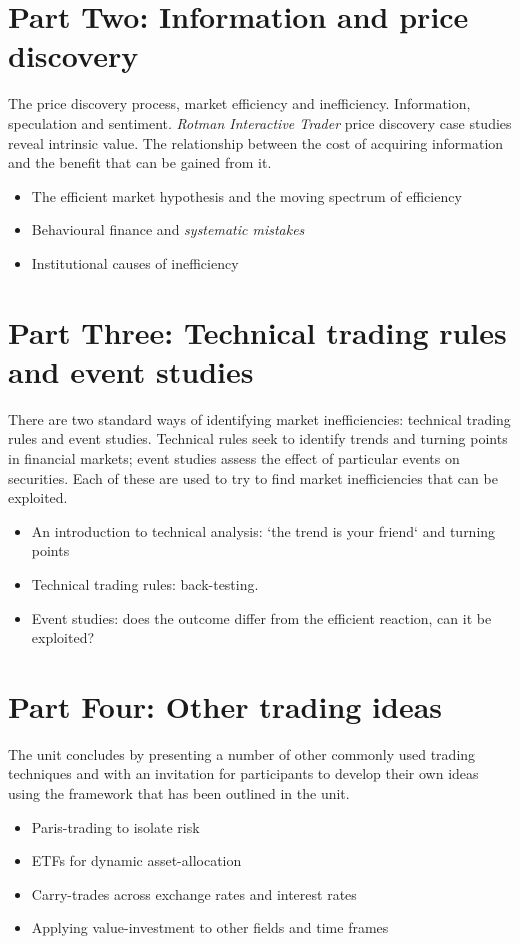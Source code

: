\documentclass[12pt, a4paper, oneside]{hitec}\usepackage[]{graphicx}\usepackage[]{color}
\begin{document}
\section*{Part Two: Information and price discovery}
The price discovery process, market efficiency and inefficiency.  Information, speculation and sentiment. \emph{Rotman Interactive Trader} price discovery case studies reveal intrinsic value.  The relationship between the cost of acquiring information and the benefit that can be gained from it. 
\begin{itemize}
\item The efficient market hypothesis and the moving spectrum of efficiency
\item Behavioural finance and \emph{systematic mistakes}
\item Institutional causes of inefficiency
\end{itemize}

\section*{Part Three: Technical trading rules and event studies}
There are two standard ways of identifying market inefficiencies: technical trading rules and event studies.  Technical rules seek to identify trends and turning points in financial markets; event studies assess the effect of particular events on securities. Each of these are used to try to find market inefficiencies that can be exploited. 
\begin{itemize}
\item An introduction to technical analysis: `the trend is your friend` and turning points
\item Technical trading rules: back-testing. 
\item Event studies: does the outcome differ from the efficient reaction, can it be exploited?
\end{itemize}

\section*{Part Four: Other trading ideas}
The unit concludes by presenting a number of other commonly used trading techniques and with an invitation for participants to develop their own ideas using the framework that has been outlined in the unit. 
\begin{itemize}
\item Paris-trading to isolate risk
\item ETFs for dynamic asset-allocation
\item Carry-trades across exchange rates and interest rates
\item Applying value-investment to other fields and time frames
\end{itemize}
\end{document}
